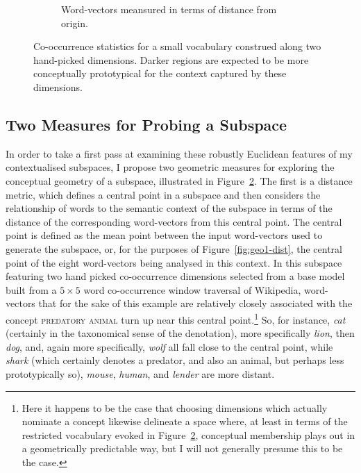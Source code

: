 \begin{figure}
\begin{subfigure}[]{0.45\textwidth}
  \caption{Word-vectors meansured in terms of distance from origin.}\label{fig:geo1-norm}
  \end{subfigure}
  \caption[Two Methods for Probing a Subspace]{Co-occurrence statistics for a small vocabulary construed along two hand-picked dimensions.  Darker regions are expected to be more conceptually prototypical for the context captured by these dimensions.}\label{fig:geo1}
\end{figure}

\subsection{Two Measures for Probing a Subspace} \label{sec:twomeasures}

In order to take a first pass at examining these robustly Euclidean features of my contextualised subspaces, I propose two geometric measures for exploring the conceptual geometry of a subspace, illustrated in Figure~\ref{fig:geo1}.  The first is a distance metric, which defines a central point in a subspace and then considers the relationship of words to the semantic context of the subspace in terms of the distance of the corresponding word-vectors from this central point.  The central point is defined as the mean point between the input word-vectors used to generate the subspace, or, for the purposes of Figure~\ref{fig:geo1-dist}, the central point of the eight word-vectors being analysed in this context.  In this subspace featuring two hand picked co-occurrence dimensions selected from a base model built from a $5 \times 5$ word co-occurrence window traversal of Wikipedia, word-vectors that for the sake of this example are relatively closely associated with the concept \textsc{predatory animal} turn up near this central point.\footnote{Here it happens to be the case that choosing dimensions which actually nominate a concept likewise delineate a space where, at least in terms of the restricted vocabulary evoked in Figure~\ref{fig:geo1}, conceptual membership plays out in a geometrically predictable way, but I will not generally presume this to be the case.}  So, for instance, \emph{cat} (certainly in the taxonomical sense of the denotation), more specifically \emph{lion}, then \emph{dog}, and, again more specifically, \emph{wolf} all fall close to the central point, while \emph{shark} (which certainly denotes a predator, and also an animal, but perhaps less prototypically so), \emph{mouse}, \emph{human}, and \emph{lender} are more distant.

